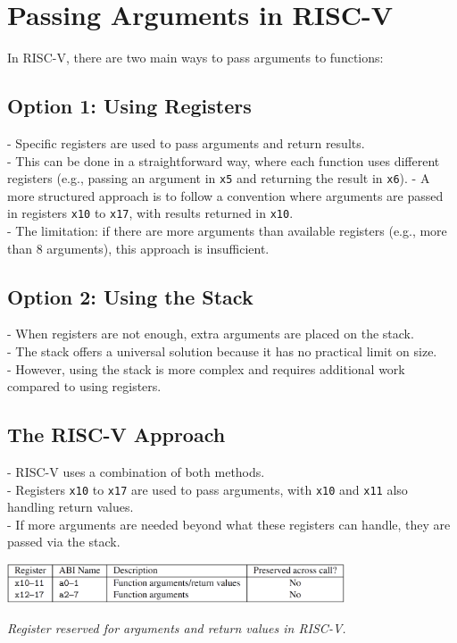 \section{Passing Arguments in RISC-V}

In RISC-V, there are two main ways to pass arguments to functions:

\subsection{Option 1: Using Registers}
- Specific registers are used to pass arguments and return results. \\
\vskip 0.1in
- This can be done in a straightforward way, where each function uses different registers (e.g., passing an argument in \texttt{x5} and returning the result in \texttt{x6}).
\vskip 0.1in
- A more structured approach is to follow a convention where arguments are passed in registers \texttt{x10} to \texttt{x17}, with results returned in \texttt{x10}.  \\
\vskip 0.1in
- The limitation: if there are more arguments than available registers (e.g., more than 8 arguments), this approach is insufficient.  \\

\subsection{Option 2: Using the Stack}
- When registers are not enough, extra arguments are placed on the stack.  \\
\vskip 0.1in
- The stack offers a universal solution because it has no practical limit on size.  \\
\vskip 0.1in
- However, using the stack is more complex and requires additional work compared to using registers.  \\

\subsection{The RISC-V Approach}
- RISC-V uses a combination of both methods.  \\
\vskip 0.1in
- Registers \texttt{x10} to \texttt{x17} are used to pass arguments, with \texttt{x10} and \texttt{x11} also handling return values. \\
\vskip 0.1in
- If more arguments are needed beyond what these registers can handle, they are passed via the stack. 

\begin{center}
    \includegraphics[width=0.75\textwidth]{chapters/chapter1b/images/arguments.png}
\end{center}
\textit{Register reserved for arguments and return values in RISC-V.}

